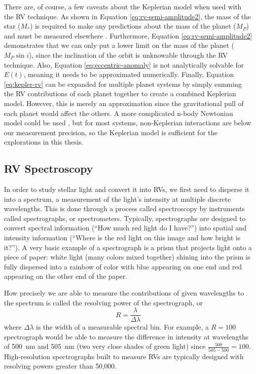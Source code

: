 There are, of course, a few caveats about the Keplerian model when used with the RV technique. As shown in Equation \ref{eq:rv-semi-amplitude2}, the mass of the star ($M_*$) is required to make any predictions about the mass of the planet ($M_P$) and must be measured elsewhere \citep[e.g.][]{gaia_collaboration_vizier_2018}. Furthermore, Equation \ref{eq:rv-semi-amplitude2} demonstrates that we can only put a lower limit on the mass of the planet ($M_P\sin{i}$), since the inclination of the orbit is unknowable through the RV technique. Also, Equation \ref{eq:eccentric-anomaly} is not analytically solvable for $E(t)$, meaning it needs to be approximated numerically. Finally, Equation \ref{eq:kepler-rv} can be expanded for multiple planet systems by simply summing the RV contributions of each planet together to create a combined Keplerian model. However, this is merely an approximation since the gravitational pull of each planet would affect the others. A more complicated n-body Newtonian model could be used \citep[e.g.][]{rivera_75_2005, fischer_five_2008}, but for most systems, non-Keplerian interactions are below our measurement precision, so the Keplerian model is sufficient for the explorations in this thesis.

\subsection{RV Spectroscopy}

In order to study stellar light and convert it into RVs, we first need to disperse it into a spectrum, a measurement of the light's intensity at multiple discrete wavelengths. This is done through a process called spectroscopy by instruments called spectrographs, or spectrometers. Typically, spectrographs are designed to convert spectral information (``How much red light do I have?'') into spatial and intensity information (``Where is the red light on this image and how bright is it?''). A very basic example of a spectrograph is a prism that projects light onto a piece of paper: white light (many colors mixed together) shining into the prism is fully dispersed into a rainbow of color with blue appearing on one end and red appearing on the other end of the paper.

How precisely we are able to measure the contributions of given wavelengths to the spectrum is called the resolving power of the spectrograph, or
\begin{equation}
    R = \frac{\lambda}{\Delta \lambda}
\end{equation}
where $\Delta \lambda$ is the width of a measurable spectral bin. For example, a $R=100$ spectrograph would be able to measure the difference in intensity at wavelengths of 500~nm and 505~nm (two very close shades of green light) since $\frac{500}{505-500} = 100$. High-resolution spectrographs built to measure RVs are typically designed with resolving powers greater than 50,000.

